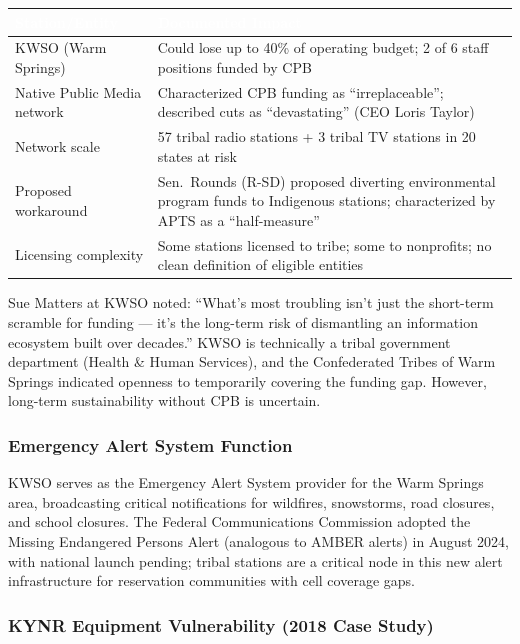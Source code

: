 \documentclass[11pt,letterpaper]{article}
\newcommand{\tableheader}[1]{\textbf{\sffamily\textcolor{white}{#1}}}
\begin{document}
\begin{center}
\begin{tabularx}{\textwidth}{L{4cm}X}
\toprule
{}
\tableheader{Station/Entity} & \tableheader{Documented Impact} \\
\midrule
KWSO (Warm Springs) & Could lose up to 40\% of operating budget; 2 of 6 staff positions funded by CPB \\
Native Public Media network & Characterized CPB funding as ``irreplaceable''; described cuts as ``devastating'' (CEO Loris Taylor) \\
Network scale & 57 tribal radio stations + 3 tribal TV stations in 20 states at risk \\
Proposed workaround & Sen.\ Rounds (R-SD) proposed diverting environmental program funds to Indigenous stations; characterized by APTS as a ``half-measure'' \\
Licensing complexity & Some stations licensed to tribe; some to nonprofits; no clean definition of eligible entities \\
\bottomrule
\end{tabularx}
\end{center}

Sue Matters at KWSO noted: ``What's most troubling isn't just the short-term scramble for funding — it's the long-term risk of dismantling an information ecosystem built over decades.'' KWSO is technically a tribal government department (Health \& Human Services), and the Confederated Tribes of Warm Springs indicated openness to temporarily covering the funding gap. However, long-term sustainability without CPB is uncertain.

\subsubsection{Emergency Alert System Function}

KWSO serves as the Emergency Alert System provider for the Warm Springs area, broadcasting critical notifications for wildfires, snowstorms, road closures, and school closures. The Federal Communications Commission adopted the Missing Endangered Persons Alert (analogous to AMBER alerts) in August 2024, with national launch pending; tribal stations are a critical node in this new alert infrastructure for reservation communities with cell coverage gaps.

\subsubsection{KYNR Equipment Vulnerability (2018 Case Study)}
\end{document}
